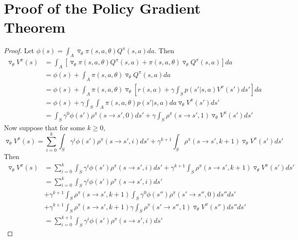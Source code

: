 \documentclass[11pt]{article}
\theoremstyle{definition}
\begin{document}
\section{Proof of the Policy Gradient Theorem}
\begin{proof} \label{PGTProof}
Let $\phi(s) = \int_A \triangledown_{\theta} \pi(s,a,\theta) Q^{\pi}(s,a) da$. Then
\begin{equation}
\begin{split}
\triangledown_{\theta} V^{\pi} (s) &= \int_A \left[ \triangledown_{\theta} \pi (s,a,\theta) Q^{\pi}(s,a) + \pi(s,a,\theta) \triangledown_{\theta} Q^{\pi}(s,a) \right] da \\
&= \phi(s) + \int_A \pi(s,a,\theta) \triangledown_{\theta} Q^{\pi}(s,a) da
\\
&= \phi(s) + \int_A \pi(s,a,\theta) \triangledown_{\theta} \left[r(s,a) + \gamma \int_S p(s'|s,a) V^{\pi}(s') ds' \right] da
\\
&= \phi(s) + \gamma \int_S \int_A \pi(s,a,\theta)p(s'|s,a)da \triangledown_{\theta}V^{\pi}(s')ds'
\\
&= \int_S \gamma^0 \phi(s') \rho^{\pi}(s \rightarrow s',0)ds' + \gamma \int_S \rho^{\pi}(s \rightarrow s', 1) \triangledown_{\theta} V^{\pi} (s') ds'
\end{split}
\end{equation}
Now suppose that for some $k \ge 0$,
\begin{equation}
\triangledown_{\theta}V^{\pi}(s) = \sum_{i=0}^k \int_S \gamma^i \phi(s') \rho^{\pi}(s \rightarrow s',i)ds' + \gamma^{k+1} \int_S \rho^{\pi}(s \rightarrow s',k+1) \triangledown_{\theta} V^{\pi}(s')ds'
\end{equation}
Then
\begin{equation}
\begin{split}
\triangledown_{\theta}V^{\pi}(s) &= \sum_{i=0}^k \int_S \gamma^i \phi(s') \rho^{\pi}(s \rightarrow s',i)ds' + \gamma^{k+1} \int_S \rho^{\pi}(s \rightarrow s',k+1) \triangledown_{\theta} V^{\pi}(s')ds'
\\
&= \sum_{i=0}^k \int_S \gamma^i \phi(s') \rho^{\pi}(s \rightarrow s',i)ds'
\\
&+ \gamma^{k+1} \int_S \rho^{\pi}(s \rightarrow s',k+1) 
  \int_S \gamma^0 \phi(s'') \rho^{\pi}(s' \rightarrow s'',0)ds''
ds' \\
&+ \gamma^{k+1} \int_S \rho^{\pi}(s \rightarrow s',k+1)
  \gamma \int_S \rho^{\pi}(s' \rightarrow s'', 1) \triangledown_{\theta} V^{\pi} (s'') ds'' ds'
  \\
&= \sum_{i=0}^{k+1} \int_S \gamma^i \phi(s') \rho^{\pi}(s \rightarrow s',i)ds'

\end{split}
\end{equation}
\end{proof}
\end{document}
